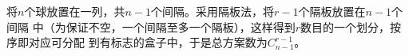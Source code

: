 \begin{solution}
    将$n$个球放置在一列，共$n-1$个间隔。采用隔板法，将$r-1$个隔板放置在$n-1$个间隔
    中（为保证不空，一个间隔至多一个隔板），这样得到$r$数目的一个划分，按序即对应可分配
    到有标志的盒子中，于是总方案数为$C_{n-1}^{r-1}$。
\end{solution}